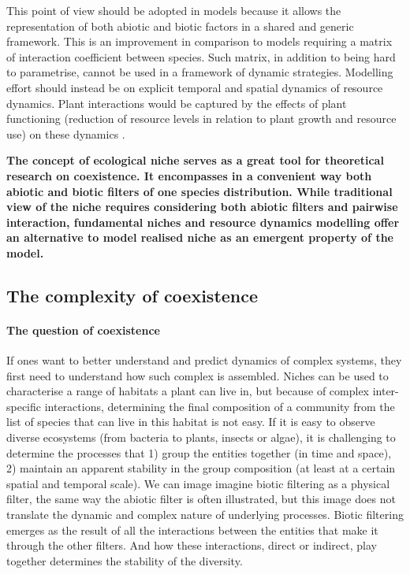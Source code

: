 This point of view should be adopted in models \parencite{berger_competition_2008} because it allows the representation of both abiotic and biotic factors in a shared and generic framework. This is an improvement in comparison to models requiring a matrix of interaction coefficient between species. Such matrix, in addition to being hard to parametrise, cannot be used in a framework of dynamic strategies. Modelling effort should instead be on explicit temporal and spatial dynamics of resource dynamics. Plant interactions would be captured by the effects of plant functioning (reduction of resource levels in relation to plant growth and resource use) on these dynamics \parencite{berger_competition_2008, morin_comparing_2009}.


\textbf{The concept of ecological niche serves as a great tool for theoretical research on coexistence. It encompasses in a convenient way both abiotic and biotic filters of one species distribution. While traditional view of the niche requires considering both abiotic filters and pairwise interaction, fundamental niches and resource dynamics modelling offer an alternative to model realised niche as an emergent property of the model.}


\subsection{The complexity of coexistence}\label{subsection:coexistence}

\paragraph{The question of coexistence}
If ones want to better understand and predict dynamics of complex systems, they first need to understand how such complex is assembled. Niches can be used to characterise a range of habitats a plant can live in, but because of complex inter-specific interactions, determining the final composition of a community from the list of species that can live in this habitat is not easy. If it is easy to observe diverse ecosystems (from bacteria to plants, insects or algae), it is challenging to determine the processes that 1) group the entities together (in time and space), 2) maintain an apparent stability in the group composition (at least at a certain spatial and temporal scale). 
We can image imagine biotic filtering as a physical filter, the same way the abiotic filter is often illustrated, but this image does not translate the dynamic and complex nature of underlying processes. Biotic filtering emerges as the result of all the interactions between the entities that make it through the other filters. And how these interactions, direct or indirect, play together determines the stability of the diversity.\\

